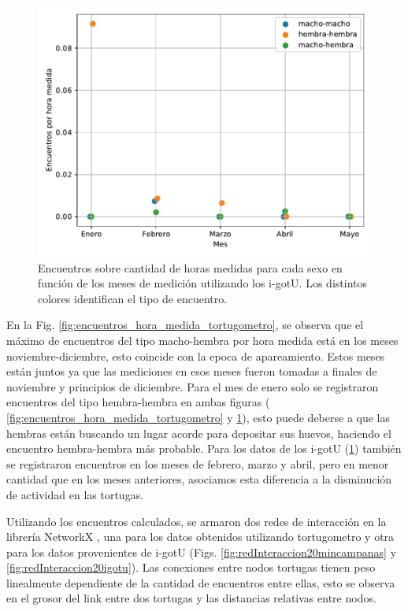 \begin{figure}[ht]
    \begin{center}
       
   
    \includegraphics[width=\imsize]{Chap2/encuentros_por_hora_igotu.pdf}
\end{center}
    \caption[Encuentros por hora medida tomando los datos de los i-gotU.]{Encuentros sobre cantidad de horas medidas para cada sexo en función de los meses de medición utilizando los i-gotU. Los distintos colores identifican el tipo de encuentro.}
    \label{fig:encuentros_hora_medida_igotu}
\end{figure}
En la Fig. \ref{fig:encuentros_hora_medida_tortugometro}, se observa que el máximo de encuentros del tipo macho-hembra por hora medida está en los meses noviembre-diciembre, esto coincide con la epoca de apareamiento. Estos meses están juntos ya que las mediciones en esos meses fueron tomadas a finales de noviembre y principios de diciembre. Para el mes de enero solo se registraron encuentros del tipo hembra-hembra en ambas figuras ( \ref{fig:encuentros_hora_medida_tortugometro} y \ref{fig:encuentros_hora_medida_igotu}), esto puede deberse a que las hembras están buscando un lugar acorde para depositar sus huevos, haciendo el encuentro hembra-hembra más probable. Para los datos de los i-gotU (\ref{fig:encuentros_hora_medida_igotu}) también se registraron encuentros en los meses de febrero, marzo y abril, pero en menor cantidad que en los meses anteriores, asociamos esta diferencia a la disminución de actividad en las tortugas.
 
 
Utilizando los encuentros calculados, se armaron dos redes de interacción  en la librería NetworkX \cite{networkx}, una para los datos obtenidos utilizando  tortugometro y otra para los datos provenientes de i-gotU (Figs. \ref{fig:redInteraccion20mincampanas} y \ref{fig:redInteraccion20igotu}). Las conexiones entre nodos tortugas tienen peso linealmente dependiente de la cantidad de encuentros entre ellas, esto se observa en el grosor del link entre dos tortugas y las distancias relativas entre nodos.
 
